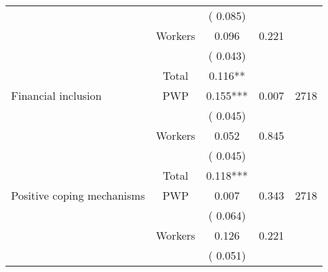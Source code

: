 \begin{tabular}{l*{4}{c}}
                               &                               &       (       0.085)                     & &                                                                             \\ 
                               &       Workers         &              0.096               &        0.221   &                                               \\ 
                               &                               &       (       0.043)                     & &                                                                             \\ 
\cmidrule{2-3}
                               &       Total           &              0.116**                 &    &                                               \\ 
\cmidrule{2-3}
 Financial inclusion                 &       PWP     &              0.155***               &        0.007   & 2718                              \\ 
                               &                               &       (       0.045)                     & &                                                                             \\ 
                               &       Workers         &              0.052               &        0.845   &                                               \\ 
                               &                               &       (       0.045)                     & &                                                                             \\ 
\cmidrule{2-3}
                               &       Total           &              0.118***                 &    &                                               \\ 
\cmidrule{2-3}
 Positive coping mechanisms                &       PWP     &              0.007               &       0.343    & 2718                              \\ 
                               &                               &       (       0.064)                     & &                                                                             \\ 
                               &       Workers         &              0.126               &        0.221   &                                               \\ 
                               &                               &       (       0.051)                     & &                                                                             \\ 

\end{tabular}
